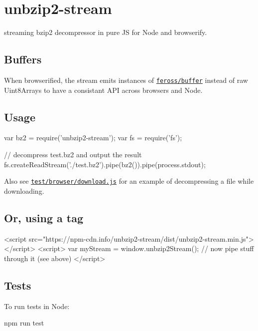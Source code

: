 \href{http://badge.fury.io/js/unbzip2-stream}{\tt }

\section*{unbzip2-\/stream }

streaming bzip2 decompressor in pure JS for Node and browserify.

\subsection*{Buffers }

When browserified, the stream emits instances of \href{https://github.com/feross/buffer}{\tt feross/buffer} instead of raw Uint8\+Arrays to have a consistant A\+PI across browsers and Node.

\subsection*{Usage }


\begin{DoxyCode}
var bz2 = require('unbzip2-stream');
var fs = require('fs');

// decompress test.bz2 and output the result
fs.createReadStream('./test.bz2').pipe(bz2()).pipe(process.stdout);
\end{DoxyCode}


Also see \href{https://github.com/regular/unbzip2-stream/blob/master/test/browser/download.js}{\tt test/browser/download.\+js} for an example of decompressing a file while downloading.

\subsection*{Or, using a  tag }


\begin{DoxyCode}
<script src="https://npm-cdn.info/unbzip2-stream/dist/unbzip2-stream.min.js"></script>
<script>
    var myStream = window.unbzip2Stream();
    // now pipe stuff through it (see above)
</script>
\end{DoxyCode}


\subsection*{Tests }

To run tests in Node\+: \begin{DoxyVerb}npm run test
\end{DoxyVerb}


